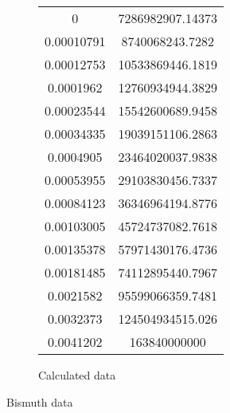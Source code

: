 \documentclass[12pt]{article}
\begin{document}
\begin{figure}[H]
\begin{subfigure}{0.5\textwidth}
\begin{tabular}{|S[round-precision = 3, round-mode=figures, scientific-notation = true]|S[round-precision = 3,round-mode=figures, scientific-notation = true]|}
            0                      & 7286982907.14373            \\
            0.00010791             & 8740068243.7282             \\
            0.00012753             & 10533869446.1819            \\
            0.0001962              & 12760934944.3829            \\
            0.00023544             & 15542600689.9458            \\
            0.00034335             & 19039151106.2863            \\
            0.0004905              & 23464020037.9838            \\
            0.00053955             & 29103830456.7337            \\
            0.00084123             & 36346964194.8776            \\
            0.00103005             & 45724737082.7618            \\
            0.00135378             & 57971430176.4736            \\
            0.00181485             & 74112895440.7967            \\
            0.0021582              & 95599066359.7481            \\
            0.0032373              & 124504934515.026            \\
            0.0041202              & 163840000000                \\ \hline
        \end{tabular}
        \caption{Calculated data}
    \end{subfigure}
    \caption{Bismuth data}
\end{figure}
\end{document}
